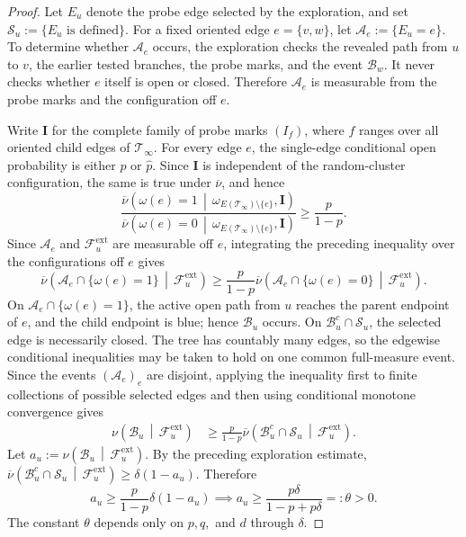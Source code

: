 \documentclass[10pt,a4paper]{amsart}
\begin{document}
\begin{proof}
Let $E_u$ denote the probe edge selected by the exploration, and set $\mathcal S_u:=\{E_u\text{ is defined}\}$. For a fixed oriented edge $e=\{v,w\}$, let $\mathcal A_e:=\{E_u=e\}$. To determine whether $\mathcal A_e$ occurs, the exploration checks the revealed path from $u$ to $v$, the earlier tested branches, the probe marks, and the event $\mathcal B_w$. It never checks whether $e$ itself is open or closed. Therefore $\mathcal A_e$ is measurable from the probe marks and the configuration off $e$.

Write $\mathbf I$ for the complete family of probe marks $(I_f)$, where $f$ ranges over all oriented child edges of $\mathcal T_\infty$. For every edge $e$, the single-edge conditional open probability is either $p$ or $\widehat p$. Since $\mathbf I$ is independent of the random-cluster configuration, the same is true under $\overline\nu$, and hence
\[
    \frac{
        \overline\nu\left(
            \omega(e)=1
            \,\middle|\,
            \omega_{E(\mathcal T_\infty)\setminus\{e\}},
            \mathbf I
        \right)
    }{
        \overline\nu\left(
            \omega(e)=0
            \,\middle|\,
            \omega_{E(\mathcal T_\infty)\setminus\{e\}},
            \mathbf I
        \right)
    }
    \ge
    \frac{p}{1-p}.
\]
Since $\mathcal A_e$ and $\mathcal F_u^{\mathrm{ext}}$ are measurable off $e$, integrating the preceding inequality over the configurations off $e$ gives
\[
    \overline\nu\left(
        \mathcal A_e\cap\{\omega(e)=1\}
        \,\middle|\,
        \mathcal F_u^{\mathrm{ext}}
    \right)
    \ge
    \frac{p}{1-p}
    \overline\nu\left(
        \mathcal A_e\cap\{\omega(e)=0\}
        \,\middle|\,
        \mathcal F_u^{\mathrm{ext}}
    \right).
\]
On $\mathcal A_e\cap\{\omega(e)=1\}$, the active open path from $u$ reaches the parent endpoint of $e$, and the child endpoint is blue; hence $\mathcal B_u$ occurs. On $\mathcal B_u^c\cap\mathcal S_u$, the selected edge is necessarily closed. The tree has countably many edges, so the edgewise conditional inequalities may be taken to hold on one common full-measure event. Since the events $(\mathcal A_e)_e$ are disjoint, applying the inequality first to finite collections of possible selected edges and then using conditional monotone convergence gives
\[
\begin{aligned}
    \nu\left(
        \mathcal B_u
        \,\middle|\,
        \mathcal F_u^{\mathrm{ext}}
    \right)
    &\ge
    \frac{p}{1-p}
    \overline\nu\left(
        \mathcal B_u^c\cap\mathcal S_u
        \,\middle|\,
        \mathcal F_u^{\mathrm{ext}}
    \right).
\end{aligned}
\]
Let $a_u:=\nu\left(\mathcal B_u\,\middle|\,\mathcal F_u^{\mathrm{ext}}\right)$. By the preceding exploration estimate, $\overline\nu\left(\mathcal B_u^c\cap\mathcal S_u\,\middle|\,\mathcal F_u^{\mathrm{ext}}\right)\ge\delta(1-a_u)$. Therefore
\[
    a_u
    \ge
    \frac{p}{1-p}\delta(1-a_u)
    \implies
    a_u
    \ge
    \frac{p\delta}{1-p+p\delta}
    =:
    \theta
    >0.
\]
The constant $\theta$ depends only on $p,q,$ and $d$ through $\delta$.
\end{proof}
\end{document}
